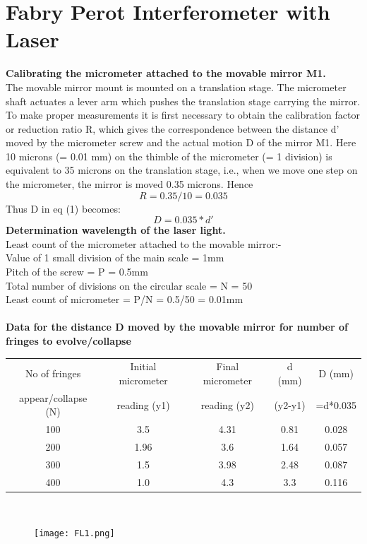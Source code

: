 \documentclass[12pt]{report}
\begin{document}
	\section{Fabry Perot Interferometer with Laser}
	\textbf{Calibrating the micrometer attached to the movable mirror M1.}\\
	The movable mirror mount is mounted on a translation stage. The micrometer shaft
	actuates a lever arm which pushes the translation stage carrying the mirror. To make
	proper measurements it is first necessary to obtain the calibration factor or reduction ratio
	R, which gives the correspondence between the distance d’ moved by the micrometer
	screw and the actual motion D of the mirror M1.
	Here 10 microns (= 0.01 mm) on the thimble of the micrometer (= 1 division) is equivalent
	to 35 microns on the translation stage, i.e., when we move one step on the micrometer, the
	mirror is moved 0.35 microns. Hence
	$$R=0.35/10=0.035$$
	Thus D in eq (1) becomes:
	$$D=0.035*d'$$
	\textbf{Determination wavelength of the laser light.}\\
	Least count of the micrometer attached to the movable mirror:-\\
	Value of 1 small division of the main scale = 1mm\\
	Pitch of the screw = P = 0.5mm\\
	Total number of divisions on the circular scale = N = 50\\
	Least count of micrometer = P/N = 0.5/50 = 0.01mm\\ \\
	\textbf{Data for the distance D moved by the movable mirror for number of fringes to evolve/collapse}
	\begin{center}
		\begin{tabular}{ |c|c|c|c|c| } 
			\hline
			No of fringes &Initial micrometer&Final micrometer& d (mm) & D (mm)\\
			appear/collapse (N)&reading (y1) &reading (y2)&(y2-y1)& =d*0.035\\
			\hline
			100 & 3.5  & 4.31 & 0.81 & 0.028 \\
			200 & 1.96 & 3.6  & 1.64 & 0.057 \\
			300 & 1.5  & 3.98 & 2.48 & 0.087 \\
			400 & 1.0    & 4.3  & 3.3  & 0.116 \\
			\hline
		\end{tabular}
		\\
	\end{center}
	\begin{figure}[h]
		\centering
		\texttt{[image: FL1.png]}
	\end{figure}
\end{document}
